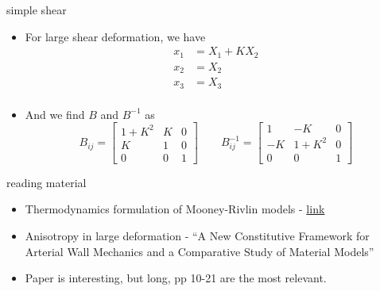 \documentclass[
  letterpaper,
  ignorenonframetext,
  aspectratio=43,
  handout,
  12pt]{beamer}
\providecommand{\tightlist}{%
  \setlength{\itemsep}{0pt}\setlength{\parskip}{0pt}}
\providecommand{\tightlist}{%
\setlength{\itemsep}{0pt}\setlength{\parskip}{0pt}}
\begin{document}
\begin{frame}{simple shear}
\protect\hypertarget{simple-shear}{}
\begin{itemize}
\item
  For large shear deformation, we have \[\begin{aligned}
    x_1 &= X_1 + KX_2\\
    x_2 &= X_2\\
    x_3 &= X_3\\
  \end{aligned}\]
\item
  And we find \(B\) and \(B^{-1}\) as \[B_{ij} = \begin{bmatrix}
    1+K^2 & K & 0\\
    K & 1 & 0\\
    0 & 0 & 1
  \end{bmatrix} \qquad B_{ij}^{-1} = \begin{bmatrix}
    1 & -K & 0\\
    -K & 1+ K^2 & 0\\
    0 & 0 & 1
  \end{bmatrix}\]
\end{itemize}
\end{frame}

\begin{frame}{reading material}
\protect\hypertarget{reading-material}{}
\begin{itemize}
\tightlist
\item
  Thermodynamics formulation of Mooney-Rivlin models -
  \href{http://continuummechanics.org/mooneyrivlin.html}{link}
\item
  Anisotropy in large deformation - ``A New Constitutive Framework for
  Arterial Wall Mechanics and a Comparative Study of Material Models''
\item
  Paper is interesting, but long, pp 10-21 are the most relevant.
\end{itemize}
\end{frame}
\end{document}
